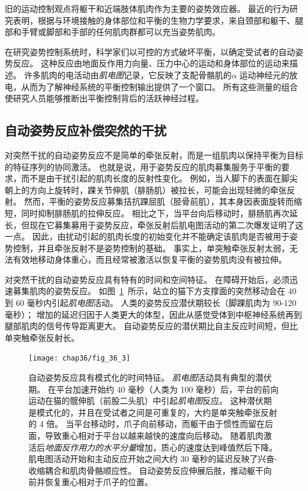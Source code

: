 旧的运动控制观点将躯干和近端肢体肌肉作为主要的姿势效应器。
最近的行为研究表明，根据与环境接触的身体部位和平衡的生物力学要求，来自颈部和躯干、腿部和手臂或脚部和手部的任何肌肉群都可以充当姿势肌肉。


在研究姿势控制系统时，科学家们以可控的方式破坏平衡，以确定受试者的自动姿势反应。
这种反应由地面反作用力向量、压力中心的运动和身体部位的运动来描述。
许多肌肉的电活动由\textit{肌电图}记录，它反映了支配骨骼肌的$ \alpha $ 运动神经元的放电，从而为了解神经系统的平衡控制输出提供了一个窗口。
所有这些测量的组合使研究人员能够推断出平衡控制背后的活跃神经过程。



\subsection{自动姿势反应补偿突然的干扰}

对突然干扰的自动姿势反应不是简单的牵张反射，而是一组肌肉以保持平衡为目标的特征序列的协同激活。
也就是说，用于姿势反应的肌肉募集服务于平衡的要求，而不是由干扰引起的肌肉长度的反射性变化。
例如，当人脚下的表面在脚尖朝上的方向上旋转时，踝关节伸肌（腓肠肌）被拉长，可能会出现轻微的牵张反射。
然而，平衡的姿势反应募集拮抗踝屈肌（胫骨前肌），其本身因表面旋转而缩短，同时抑制腓肠肌的拉伸反应。
相比之下，当平台向后移动时，腓肠肌再次延长，但现在它募集募用于姿势反应，牵张反射后肌电图活动的第二次爆发证明了这一点。
因此，由扰动引起的肌肉长度的初始变化并不能确定该肌肉是否被用于姿势控制，并且牵张反射不是姿势控制的基础。
事实上，单突触牵张反射太弱，无法有效地移动身体重心，而且经常被激活以恢复平衡的姿势肌肉没有被拉伸。


对突然干扰的自动姿势反应具有特有的时间和空间特征。 在障碍开始后，必须迅速募集肌肉的姿势反应。
如图~\ref{fig:36_3}~所示，站立的猫下方支撑面的突然移动会在 40 到 60 毫秒内引起\textit{肌电图}活动。
人类的姿势反应潜伏期较长（脚踝肌肉为 90-120 毫秒）；
增加的延迟归因于人类更大的体型，因此从感觉受体到中枢神经系统再到腿部肌肉的信号传导距离更大。
自动姿势反应的潜伏期比自主反应时间短，但比单突触牵张反射长。


\begin{figure}[htbp]
	\centering
	\texttt{[image: chap36/fig\_36\_3]}
	\caption{自动姿势反应具有模式化的时间特征。
		\textit{肌电图}活动具有典型的潜伏期。
		在平台加速开始约 40 毫秒（人类为 100 毫秒）后，平台的前向运动在猫的髋伸肌（前股二头肌）中引起\textit{肌电图}反应。
		这种潜伏期是模式化的，并且在受试者之间是可重复的，大约是单突触牵张反射的 4 倍。
		当平台移动时，爪子向前移动，而躯干由于惯性而留在后面，导致重心相对于平台以越来越快的速度向后移动。
		随着肌肉激活后\textit{地面反作用力的水平分量}增加，质心的速度达到峰值然后下降。
		肌电图活动开始和主动反应开始之间大约 30 毫秒的延迟反映了兴奋-收缩耦合和肌肉骨骼顺应性。
		自动姿势反应伸展后肢，推动躯干向前并恢复重心相对于爪子的位置。}
	\label{fig:36_3}
\end{figure}


